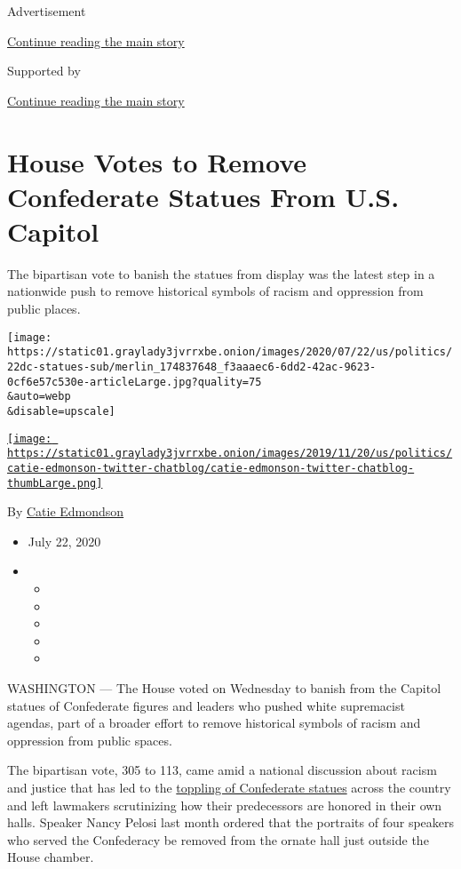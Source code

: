 Advertisement

\protect\hyperlink{after-top}{Continue reading the main story}

Supported by

\protect\hyperlink{after-sponsor}{Continue reading the main story}

\hypertarget{house-votes-to-remove-confederate-statues-from-us-capitol}{%
\section{House Votes to Remove Confederate Statues From U.S.
Capitol}\label{house-votes-to-remove-confederate-statues-from-us-capitol}}

The bipartisan vote to banish the statues from display was the latest
step in a nationwide push to remove historical symbols of racism and
oppression from public places.

\texttt{[image: https://static01.graylady3jvrrxbe.onion/images/2020/07/22/us/politics/22dc-statues-sub/merlin\_174837648\_f3aaaec6-6dd2-42ac-9623-0cf6e57c530e-articleLarge.jpg?quality=75\\\&auto=webp\\\&disable=upscale]}

\href{https://www.nytimes3xbfgragh.onion/by/catie-edmondson}{\texttt{[image: https://static01.graylady3jvrrxbe.onion/images/2019/11/20/us/politics/catie-edmonson-twitter-chatblog/catie-edmonson-twitter-chatblog-thumbLarge.png]}}

By \href{https://www.nytimes3xbfgragh.onion/by/catie-edmondson}{Catie
Edmondson}

\begin{itemize}
\item
  July 22, 2020
\item
  \begin{itemize}
  \item
  \item
  \item
  \item
  \item
  \end{itemize}
\end{itemize}

WASHINGTON --- The House voted on Wednesday to banish from the Capitol
statues of Confederate figures and leaders who pushed white supremacist
agendas, part of a broader effort to remove historical symbols of racism
and oppression from public spaces.

The bipartisan vote, 305 to 113, came amid a national discussion about
racism and justice that has led to the
\href{https://www.nytimes3xbfgragh.onion/news-event/confederate-flags-monuments-statues}{toppling
of Confederate statues} across the country and left lawmakers
scrutinizing how their predecessors are honored in their own halls.
Speaker Nancy Pelosi last month ordered that the portraits of four
speakers who served the Confederacy be removed from the ornate hall just
outside the House chamber.

